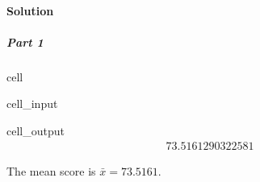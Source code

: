\documentclass[letterpaper,10pt,english]{jupyterBook}
\begin{document}
\paragraph{Solution}
\label{\detokenize{Ch2 Descriptive Statistics/2.3 Measures of Dispersion:id2}}

\subparagraph{Part 1}
\label{\detokenize{Ch2 Descriptive Statistics/2.3 Measures of Dispersion:id3}}
\begin{sphinxuseclass}{cell}\begin{sphinxVerbatimInput}

\begin{sphinxuseclass}{cell_input}
\begin{sphinxVerbatim}[commandchars=\\\{\}]


\end{sphinxVerbatim}

\end{sphinxuseclass}\end{sphinxVerbatimInput}
\begin{sphinxVerbatimOutput}

\begin{sphinxuseclass}{cell_output}\begin{equation*}
\begin{split}73.5161290322581\end{split}
\end{equation*}
\end{sphinxuseclass}\end{sphinxVerbatimOutput}

\end{sphinxuseclass}
\sphinxAtStartPar
The mean score is \(\bar{x} = 73.5161\).
\end{document}

